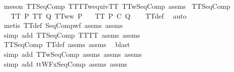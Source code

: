 \begin{isabellebody}
\ {\isacharparenleft}meson\ TT{}{\isacharunderscore}SeqComp\ TT{}{\isacharunderscore}TT{}w{\isacharunderscore}equiv{\isacharunderscore}TT{}\ TT{}w{\isacharunderscore}SeqComp\ assms{\isacharparenright}%
\endisatagproof
{\isafoldproof}%
%
\isadelimproof
\isanewline
%
\endisadelimproof
\isanewline
{}\isamarkupfalse%
\ TT{\isacharunderscore}SeqComp{\isacharcolon}\ \isanewline
\ \ \ {\isachardoublequoteopen}TT\ P{\isachardoublequoteclose}\ {\isachardoublequoteopen}TT\ Q{\isachardoublequoteclose}\ {\isachardoublequoteopen}TT{}ww\ P{\isachardoublequoteclose}\isanewline
\ \ \ {\isachardoublequoteopen}TT\ {\isacharparenleft}P\ {\isacharsemicolon}\isactrlsub C\ Q{\isacharparenright}{\isachardoublequoteclose}\isanewline
%
\isadelimproof
\ \ %
\endisadelimproof
%
\isatagproof
{}\isamarkupfalse%
\ TT{\isacharunderscore}def\ \isamarkupfalse%
\ auto\isanewline
\ \ \isamarkupfalse%
\ {\isacharparenleft}metis\ TT{\isacharunderscore}def\ SeqComp{\isacharunderscore}wf\ assms{\isacharparenleft}{}{\isacharparenright}\ assms{\isacharparenleft}{}{\isacharparenright}{\isacharparenright}\isanewline
\ \ \isamarkupfalse%
\ {\isacharparenleft}simp\ add{\isacharcolon}\ TT{}{\isacharunderscore}SeqComp\ TT{\isacharunderscore}TT{}\ assms{\isacharparenleft}{}{\isacharparenright}\ assms{\isacharparenleft}{}{\isacharparenright}{\isacharparenright}\isanewline
\ \ \isamarkupfalse%
\ TT{}{\isacharunderscore}SeqComp\ TT{\isacharunderscore}def\ assms{\isacharparenleft}{}{\isacharparenright}\ assms{\isacharparenleft}{}{\isacharparenright}\ \isamarkupfalse%
\ blast\isanewline
\ \ \isamarkupfalse%
\ {\isacharparenleft}simp\ add{\isacharcolon}\ TT{}w{\isacharunderscore}SeqComp\ assms{\isacharparenleft}{}{\isacharparenright}\ assms{\isacharparenleft}{}{\isacharparenright}\ assms{\isacharparenleft}{}{\isacharparenright}{\isacharparenright}\isanewline
\ \ \isamarkupfalse%
\ {\isacharparenleft}simp\ add{\isacharcolon}\ ttWFx{\isacharunderscore}SeqComp\ assms{\isacharparenleft}{}{\isacharparenright}\ assms{\isacharparenleft}{}{\isacharparenright}{\isacharparenright}\isanewline
\ \ \isamarkupfalse%
%
\endisatagproof
{\isafoldproof}%
%
\isadelimproof

\end{isabellebody}
